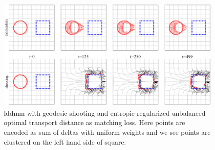 \documentclass[11pt]{article}
\begin{document}
\begin{center} 
\begin{figure}[h!]
    \includegraphics[width=\textwidth]{assets/plt_lddmm_points} 
    \caption{lddmm with geodesic shooting and entropic regularized unbalanced optimal transport distance as matching loss. Here points are encoded as sum of deltas with uniform weights and we see points are clustered on the left hand side of square. }
    \label{fig:plt_lddmm_points}
\end{figure}
\end{center} 
    
 



\newpage
\printbibliography 
\end{document}
